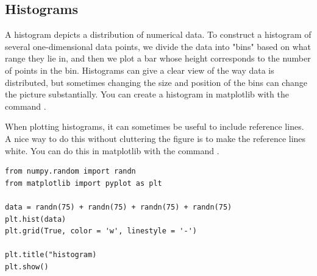 \subsection*{Histograms}


A histogram depicts a distribution of numerical data.  To construct a histogram of several one-dimensional data points, we divide the data into "bins" based on what range they lie in, and then we plot a bar whose height corresponds to the number of points in the bin.  Histograms can give a clear view of the way data is distributed, but sometimes changing the size and position of the bins can change the picture substantially.  You can create a histogram in matplotlib with the command . 

When plotting histograms, it can sometimes be useful to include reference lines.  A nice way to do this without cluttering the figure is to make the reference lines white.  You can do this in matplotlib with the command .




\begin{lstlisting}
from numpy.random import randn
from matplotlib import pyplot as plt

data = randn(75) + randn(75) + randn(75) + randn(75)
plt.hist(data)
plt.grid(True, color = 'w', linestyle = '-')

plt.title("histogram)
plt.show()

\end{lstlisting}

